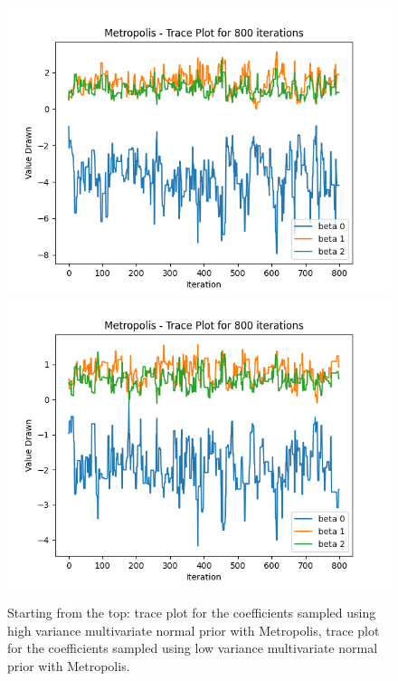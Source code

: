 \documentclass{article}
\begin{document}
\begin{figure}[htp]
    \centering
    \includegraphics[scale=0.6]{images/trace_metropolis_highvar_800_warmup_0.png}
    \includegraphics[scale=0.6]{images/trace_metropolis_lowvar_800_warmup_0.png}
    \caption{Starting from the top: trace plot for the coefficients sampled using high variance multivariate normal prior with Metropolis, trace plot for the coefficients sampled using low variance multivariate normal prior with Metropolis.}
    \label{fig:trace_2}
\end{figure}
\end{document}
